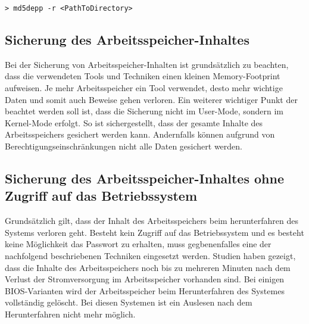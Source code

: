 \begin{lstlisting}
> md5depp -r <PathToDirectory>
\end{lstlisting}



\subsection{Sicherung des Arbeitsspeicher-Inhaltes}
Bei der Sicherung von Arbeitsspeicher-Inhalten ist grundsätzlich zu beachten, dass die verwendeten Tools und Techniken einen kleinen Memory-Footprint aufweisen. Je mehr Arbeitsspeicher ein Tool verwendet, desto mehr wichtige Daten und somit auch Beweise gehen verloren. Ein weiterer wichtiger Punkt der beachtet werden soll ist, dass die Sicherung nicht im User-Mode, sondern im Kernel-Mode erfolgt. So ist sichergestellt, dass der gesamte Inhalte des Arbeitsspeichers gesichert werden kann. Andernfalls können aufgrund von Berechtigungseinschränkungen nicht alle Daten gesichert werden.

\subsection{Sicherung des Arbeitsspeicher-Inhaltes ohne Zugriff auf das Betriebssystem} 
Grundsätzlich gilt, dass der Inhalt des Arbeitsspeichers beim herunterfahren des Systems verloren geht. Besteht kein Zugriff auf das Betriebssystem und es besteht keine Möglichkeit das Passwort zu erhalten, muss gegbenenfalles eine der nachfolgend beschriebenen Techniken eingesetzt werden. Studien haben gezeigt, dass die Inhalte des Arbeitsspeichers noch bis zu mehreren Minuten nach dem Verlust der Stromversorgung im Arbeitsspeicher vorhanden sind. Bei einigen BIOS-Varianten wird der Arbeitsspeicher beim Herunterfahren des Systemes vollständig gelöscht. Bei diesen Systemen ist ein Auslesen nach dem Herunterfahren nicht mehr möglich.

